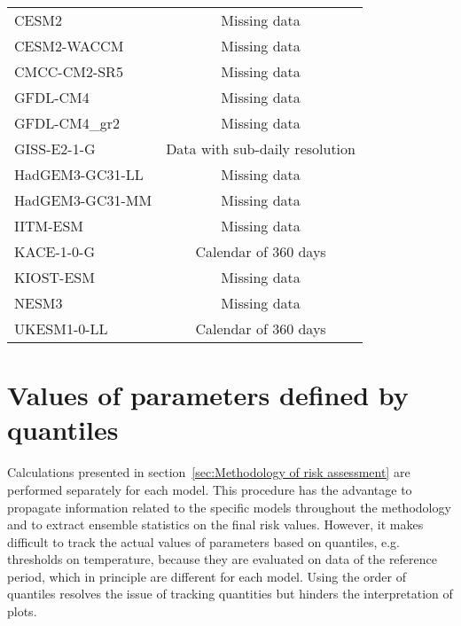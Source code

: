 \begin{table}
\begin{tabular}{lc}
    \hline
    CESM2            & Missing data                   \\
    CESM2-WACCM      & Missing data                   \\
    CMCC-CM2-SR5     & Missing data                   \\
    GFDL-CM4         & Missing data                   \\
    GFDL-CM4\_gr2    & Missing data                   \\
    GISS-E2-1-G      & Data with sub-daily resolution \\
    HadGEM3-GC31-LL  & Missing data                   \\
    HadGEM3-GC31-MM  & Missing data                   \\
    IITM-ESM         & Missing data                   \\
    KACE-1-0-G       & Calendar of 360 days           \\
    KIOST-ESM        & Missing data                   \\
    NESM3            & Missing data                   \\
    UKESM1-0-LL      & Calendar of 360 days           \\
  \end{tabular}
\end{table}



\section{Values of parameters defined by quantiles}
\label{sec:Values of parameters defined by quantiles}
Calculations presented in section~\ref{sec:Methodology of risk assessment} are performed separately for each model. This procedure has the advantage to propagate information related to the specific models throughout the methodology and to extract ensemble statistics on the final risk values.
However, it makes difficult to track the actual values of parameters based on quantiles, e.g. thresholds on temperature, because they are evaluated on data of the reference period, which in principle are different for each model. Using the order of quantiles resolves the issue of tracking quantities but hinders the interpretation of plots.

